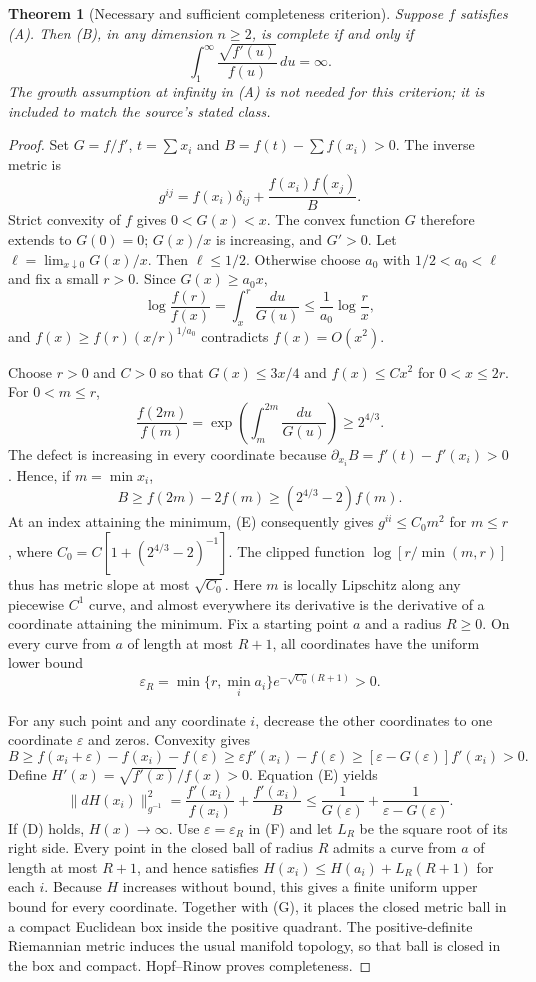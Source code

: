 \documentclass[11pt,a4paper]{article}
\newtheorem{theorem}{Theorem}
\begin{document}
\begin{theorem}[Necessary and sufficient completeness criterion]
Suppose $f$ satisfies (A). Then (B), in any dimension $n\ge2$, is
complete if and only if
\[
 \int_1^\infty\frac{\sqrt{f'(u)}}{f(u)}\,du=\infty.
\tag{D}
\]
The growth assumption at infinity in (A) is not needed for this
criterion; it is included to match the source's stated class.
\end{theorem}
\begin{proof}
Set $G=f/f'$, $t=\sum x_i$ and $B=f(t)-\sum f(x_i)>0$.
The inverse metric is
\[
 g^{ij}=f(x_i)\delta_{ij}+\frac{f(x_i)f(x_j)}B.
\tag{E}
\]
Strict convexity of $f$ gives $0<G(x)<x$. The convex function $G$
therefore extends to $G(0)=0$; $G(x)/x$ is increasing, and $G'>0$.
Let $\ell=\lim_{x\downarrow0}G(x)/x$. Then $\ell\le1/2$. Otherwise choose
$a_0$ with $1/2<a_0<\ell$ and fix a small $r>0$. Since $G(x)\ge a_0x$,
\[
 \log\frac{f(r)}{f(x)}=\int_x^r\frac{du}{G(u)}
 \le\frac1{a_0}\log\frac rx,
\]
and $f(x)\ge f(r)(x/r)^{1/a_0}$ contradicts $f(x)=O(x^2)$.

Choose $r>0$ and $C>0$ so that $G(x)\le3x/4$ and $f(x)\le Cx^2$
for $0<x\le2r$. For $0<m\le r$,
\[
 \frac{f(2m)}{f(m)}=
 \exp\left(\int_m^{2m}\frac{du}{G(u)}\right)\ge2^{4/3}.
\]
The defect is increasing in every coordinate because
$\partial_{x_i}B=f'(t)-f'(x_i)>0$. Hence, if $m=\min x_i$,
\[
 B\ge f(2m)-2f(m)\ge(2^{4/3}-2)f(m).
\]
At an index attaining the minimum, (E) consequently gives
$g^{ii}\le C_0m^2$ for $m\le r$, where
$C_0=C[1+(2^{4/3}-2)^{-1}]$.
The clipped function $\log[r/\min(m,r)]$ thus has metric slope at most
$\sqrt{C_0}$. Here $m$ is locally Lipschitz along any piecewise $C^1$
curve, and almost everywhere its derivative is the derivative of a
coordinate attaining the minimum. Fix a starting point $a$ and a
radius $R\ge0$. On every curve from $a$ of length at most $R+1$,
all coordinates have the uniform lower bound
\[
 \varepsilon_R=\min\{r,\min_i a_i\}
                  e^{-\sqrt{C_0}(R+1)}>0.
\tag{G}
\]

For any such point and any coordinate $i$, decrease the other
coordinates to one coordinate $\varepsilon$ and zeros. Convexity gives
\[
 B\ge f(x_i+\varepsilon)-f(x_i)-f(\varepsilon)
 \ge\varepsilon f'(x_i)-f(\varepsilon)
 \ge[\varepsilon-G(\varepsilon)]f'(x_i)>0.
\]
Define $H'(x)=\sqrt{f'(x)}/f(x)>0$. Equation (E) yields
\[
 \|dH(x_i)\|_{g^{-1}}^2
 =\frac{f'(x_i)}{f(x_i)}+\frac{f'(x_i)}B
 \le\frac1{G(\varepsilon)}
        +\frac1{\varepsilon-G(\varepsilon)}.
\tag{F}
\]
If (D) holds, $H(x)\to\infty$. Use $\varepsilon=\varepsilon_R$ in (F)
and let $L_R$ be the square root of its right side. Every point in the
closed ball of radius $R$ admits a curve from $a$ of length at most
$R+1$, and hence satisfies
$H(x_i)\le H(a_i)+L_R(R+1)$ for each $i$. Because $H$ increases without
bound, this gives a finite uniform upper bound for every coordinate.
Together with (G), it places the closed metric ball in a compact
Euclidean box inside the positive quadrant. The positive-definite Riemannian
metric induces the usual manifold topology, so that ball is closed in
the box and compact. Hopf--Rinow proves completeness.


\end{proof}
\end{document}
